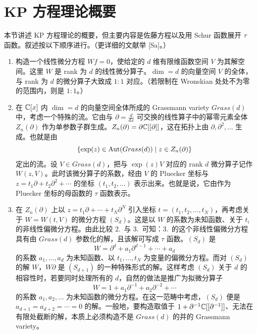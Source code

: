 
\section{KP 方程理论概要}

本节讲述 KP 方程理论的概要，但主要内容是佐藤方程以及用 Schur 函数展开 $\tau$ 函数。叙述按以下顺序进行。（更详细的文献举 [Sa]。）

\begin{enumerate}[label=\arabic*.,leftmargin=2.4em,itemsep=5pt,topsep=5pt]
\item 构造一个线性微分方程 $Wf=0$，使给定的 $d$ 维有限维函数空间 $V$ 为其解空间。这里 $W$ 是 rank 为 $d$ 的线性微分算子。$\dim=d$ 的向量空间 $V$ 的全体，与 rank 为 $d$ 的微分算子大致成 $1:1$ 对应。（若限制在 Wronskian 处处不为零的范围内，则是 $1:1$。）

\item 在 $\mathbb{C}[x]$ 内 $\dim=d$ 的向量空间全体所成的 Grassmann variety $Grass(d)$ 中，考虑一个特殊的流。它由与 $\partial=\frac{d}{dx}$ 可交换的线性算子中的幂零元素全体 $Z_n(\partial)$ 作为单参数子群生成。$Z_n(\partial)=\partial\mathbb{C}[[\partial]]$，这在拓扑上由 $\partial,\partial^2,\dots$ 生成。也就是由
\[
\{\exp(z)\in\operatorname{Aut}(Grass(d))\mid z\in Z_n(\partial)\}
\]
定出的流。设 $V\in Grass(d)$，把与 $\exp(z)V$ 对应的 rank $d$ 微分算子记作 $W(z,V)$。此时该微分算子的系数，经由 $V$ 的 Pluecker 坐标与 $z=t_1\partial+t_2\partial^2+\cdots$ 的坐标 $(t_1,t_2,\dots)$ 表示出来。也就是说，它由作为 Pluecker 坐标的母函数的 $\tau$ 函数表示。

\item 在 $Z_n(\partial)$ 上以 $z=t_1\partial+\cdots+t_N\partial^N$ 引入坐标 $t=(t_1,t_2,\dots,t_N)$，再考虑关于 $W=W(t,V)$ 的微分方程 $(S_d)$。这是以 $W$ 的系数为未知函数、关于 $t_i$ 的非线性偏微分方程。由此比较 2.\ 与 3.\ 可知：3.\ 的这个非线性偏微分方程具有由 $Grass(d)$ 参数化的解，且该解可写成 $\tau$ 函数。$(S_d)$ 是
\[
W=\partial^d+a_1\partial^{d-1}+\cdots+a_d
\]
的系数 $a_1,\dots,a_d$ 为未知函数、以 $t_1,\dots,t_N$ 为变量的偏微分方程。而对 $(S_d)$ 的解 $W$，$W\partial$ 是 $(S_{d+1})$ 的一种特殊形式的解。这样考虑 $(S_d)$ 关于 $d$ 的相容性时，若要同时处理所有的 $d$，自然的做法是推广为拟微分算子
\[
W=1+a_1\partial^{-1}+a_2\partial^{-2}+\cdots
\]
的系数 $a_1,a_2,\dots$ 为未知函数的微分方程。在这一范畴中考虑，$(S_d)$ 便是 $a_{d+1}=a_{d+2}=\cdots=0$ 的解。一般地，要构造取值于 $1+\partial^{-1}\mathbb{C}[[\partial^{-1}]]$、无法在有限处截断的解，本质上必须构造不是 $Grass(d)$ 的并的 Grassmann variety。


\end{enumerate}
